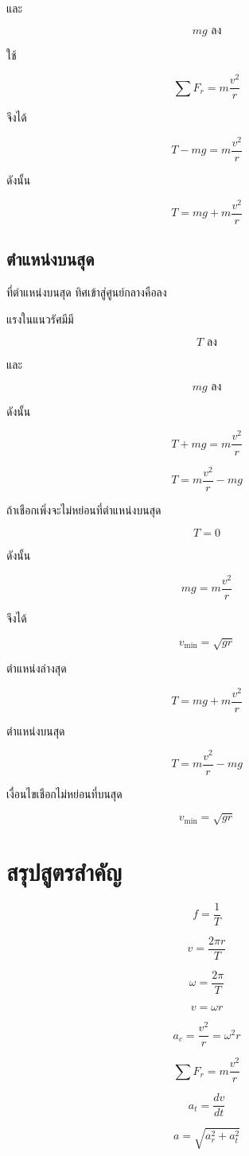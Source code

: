 และ

\[
mg \text{ ลง}
\]

ใช้

\[
\sum F_r=m\frac{v^2}{r}
\]

จึงได้

\[
T-mg=m\frac{v^2}{r}
\]

ดังนั้น

\[
T=mg+m\frac{v^2}{r}
\]

\subsection{ตำแหน่งบนสุด}

ที่ตำแหน่งบนสุด ทิศเข้าสู่ศูนย์กลางคือลง

แรงในแนวรัศมีมี

\[
T \text{ ลง}
\]

และ

\[
mg \text{ ลง}
\]

ดังนั้น

\[
T+mg=m\frac{v^2}{r}
\]

\[
T=m\frac{v^2}{r}-mg
\]

ถ้าเชือกเพิ่งจะไม่หย่อนที่ตำแหน่งบนสุด

\[
T=0
\]

ดังนั้น

\[
mg=m\frac{v^2}{r}
\]

จึงได้

\[
v_{\min}=\sqrt{gr}
\]

\begin{tcolorbox}[title=วงกลมแนวดิ่ง]
ตำแหน่งล่างสุด

\[
T=mg+m\frac{v^2}{r}
\]

ตำแหน่งบนสุด

\[
T=m\frac{v^2}{r}-mg
\]

เงื่อนไขเชือกไม่หย่อนที่บนสุด

\[
v_{\min}=\sqrt{gr}
\]
\end{tcolorbox}

\section{สรุปสูตรสำคัญ}

\begin{tcolorbox}[title=สรุปบท: การเคลื่อนที่เป็นวงกลม]
\[
f=\frac{1}{T}
\]

\[
v=\frac{2\pi r}{T}
\]

\[
\omega=\frac{2\pi}{T}
\]

\[
v=\omega r
\]

\[
a_c=\frac{v^2}{r}=\omega^2r
\]

\[
\sum F_r=m\frac{v^2}{r}
\]

\[
a_t=\frac{dv}{dt}
\]

\[
a=\sqrt{a_r^2+a_t^2}
\]
\end{tcolorbox}

